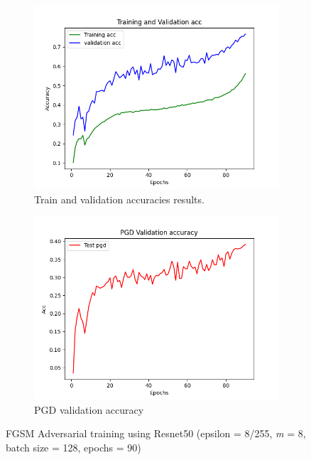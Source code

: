 \documentclass{article}
\begin{document}
\begin{figure}[hbt!]
  \centering
  \begin{subfigure}[b]{0.4\linewidth}
    \includegraphics[width=\linewidth]{images/FastResnet/Figure_2.png}
    \caption{ Train and validation accuracies results.}
  \end{subfigure}
  \begin{subfigure}[b]{0.4\linewidth}
    \includegraphics[width=\linewidth]{images/FastResnet/Figure_5.png}
    \caption{PGD validation accuracy}
  \end{subfigure}
  \caption{FGSM Adversarial training using Resnet50 (epsilon = 8/255, \textit{m} = 8, batch size = 128, epochs = 90)}
  \label{fig:coffee}
\end{figure}
\newpage
\end{document}
